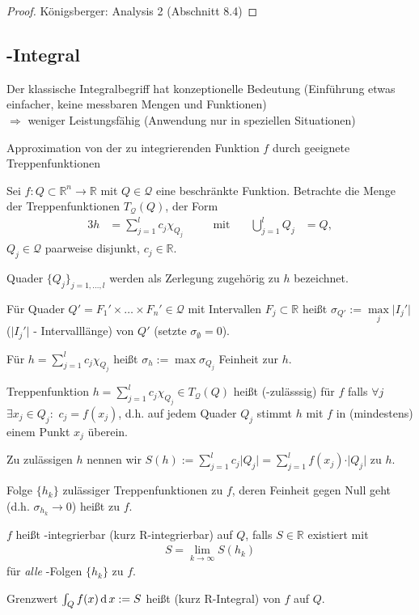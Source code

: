 \begin{proof}
	Königsberger: Analysis 2 (Abschnitt 8.4)
\end{proof}

\subsection{-Integral}
Der klassische Integralbegriff hat konzeptionelle Bedeutung (Einführung etwas einfacher, keine messbaren Mengen und Funktionen) \\
$\Rightarrow$ weniger Leistungsfähig (Anwendung nur in speziellen Situationen)

\begin{underlinedenvironment}[ebenfalls]
	Approximation von der zu integrierenden Funktion $f$ durch geeignete Treppenfunktionen
	
	Sei $f:Q\subset\mathbb{R}^n\to\mathbb{R}$ mit $Q\in\mathcal{Q}$ eine beschränkte Funktion. Betrachte die Menge der Treppenfunktionen $T_{\mathcal{Q}}(Q)$, der Form \begin{alignat*}{3}
		h &= \sum_{j=1}^l c_j \chi_{Q_j} & &\quad\text{mit}\quad & \bigcup_{j=1}^l Q_j&= Q,
	\end{alignat*}
	$Q_j\in\mathcal{Q}$ paarweise disjunkt, $c_j\in \mathbb{R}$.
	
	Quader $\{ Q_j\}_{j=1,\dotsc,l}$ werden als Zerlegung zugehörig zu $h$ bezeichnet.
\end{underlinedenvironment}

\begin{*definition}
	Für Quader $Q' = F_1'\times \dotsc\times F_n'\in\mathcal{Q}$ mit Intervallen $F_j\subset\mathbb{R}$ heißt $\sigma_{Q'} := \max\limits_{j} \vert I_j'\vert$ ($\vert I_j'\vert$ - Intervalllänge)  von $Q'$ (setzte $\sigma_\emptyset = 0$).
	
	Für $h=\sum_{j=1}^l c_j \chi_{Q_j}$ heißt $\sigma_h := \max \sigma_{Q_j}$ Feinheit zur  $h$.
	
	Treppenfunktion $h=\sum_{j=1}^l c_j \chi_{Q_j}\in T_{\mathcal{Q}}(Q)$ heißt  (-zulässsig) für $f$ falls $\forall j$ $\exists x_j\in Q_j:$ $c_j = f(x_j)$, d.h. auf jedem Quader $Q_j$ stimmt $h$ mit $f$ in (mindestens) einem Punkt $x_j$ überein.
	
	Zu zulässigen $h$ nennen wir $S(h) := \sum_{j=1}^l c_j \vert Q_j\vert = \sum_{j=1}^l f(x_j) \cdot \vert Q_j\vert$  zu $h$.
	
	Folge $\{ h_k\}$ zulässiger Treppenfunktionen zu $f$, deren Feinheit gegen Null geht (d.h. $\sigma_{h_k}\to 0$) heißt  zu $f$.
	
	$f$ heißt -integrierbar (kurz R-integrierbar) auf $Q$, falls $S\in \mathbb{R}$ existiert mit \begin{align}
	S = \lim\limits_{k\to\infty} S(h_k)\end{align} für \emph{alle} -Folgen $\{ h_k \}$ zu $f$.
	
	Grenzwert $\int_Q f(x) \operatorname{d} x := S$ heißt  (kurz R-Integral) von $f$ auf $Q$.
\end{*definition}

